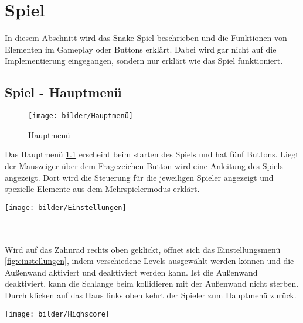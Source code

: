 \chapter{Spiel}
\label{Spiel}
%
In diesem Abschnitt wird das Snake Spiel beschrieben und die Funktionen von Elementen im Gameplay oder Buttons erklärt. Dabei wird gar nicht auf die Implementierung eingegangen, sondern nur erklärt wie das Spiel funktioniert.


\section{Spiel - Hauptmenü}
\label{Spiel_-_Unterkapitel_1}
%
\begin{figure}[h]
 \centering
 \texttt{[image: bilder/Hauptmenü]}
 \caption{Hauptmenü}
 \label{fig:hauptmenü}
\end{figure}
Das Hauptmenü \ref{fig:hauptmenü} erscheint beim starten des Spiels und hat fünf Buttons. Liegt der Mauszeiger über dem Fragezeichen-Button wird eine Anleitung des Spiels angezeigt. Dort wird die Steuerung für die jeweiligen Spieler angezeigt und spezielle Elemente aus dem Mehrspielermodus erklärt.\\
\begin{minipage}[X]{1.1\textwidth}
 \centering
 \texttt{[image: bilder/Einstellungen]}
 \label{fig:einstellungen}
\end{minipage}
\newline \\ \\
Wird auf das Zahnrad rechts oben geklickt, öffnet sich das Einstellungsmenü \ref{fig:einstellungen}, indem verschiedene Levels ausgewählt werden können und die Außenwand aktiviert und deaktiviert werden kann. Ist die Außenwand deaktiviert, kann die Schlange beim kollidieren mit der Außenwand nicht sterben. Durch klicken auf das Haus links oben kehrt der Spieler zum Hauptmenü zurück.\newline \newline \\ 
\begin{minipage}[X]{1.1\textwidth}
 \centering
 \texttt{[image: bilder/Highscore]}
 \label{fig:highscore}
\end{minipage}

